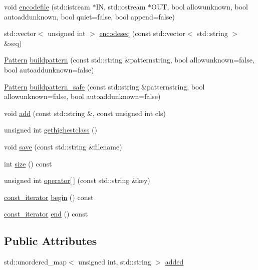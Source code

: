\begin{DoxyCompactItemize}
\item 
void \hyperlink{classClassEncoder_ac18800b64264d93383234ddeed0098d3}{encodefile} (std\+::istream $\ast$I\+N, std\+::ostream $\ast$O\+U\+T, bool allowunknown, bool autoaddunknown, bool quiet=false, bool append=false)
\item 
std\+::vector$<$ unsigned int $>$ \hyperlink{classClassEncoder_ae1c2529c9abd544f618c821067ee39c9}{encodeseq} (const std\+::vector$<$ std\+::string $>$ \&seq)
\item 
\hyperlink{classPattern}{Pattern} \hyperlink{classClassEncoder_ac517bd3fb8129c7a525479b015d91e01}{buildpattern} (const std\+::string \&patternstring, bool allowunknown=false, bool autoaddunknown=false)
\item 
\hyperlink{classPattern}{Pattern} \hyperlink{classClassEncoder_af65d2963df9698d6ff6a0740f506feae}{buildpattern\+\_\+safe} (const std\+::string \&patternstring, bool allowunknown=false, bool autoaddunknown=false)
\item 
void \hyperlink{classClassEncoder_af63308ff3a1bd315fa921becee25f97a}{add} (const std\+::string \&, const unsigned int cls)
\item 
unsigned int \hyperlink{classClassEncoder_a295adb48f47845aa5842c68b00b24b9a}{gethighestclass} ()
\item 
void \hyperlink{classClassEncoder_a171525ba62fd46cb8f79dcfbf1b39c7e}{save} (const std\+::string \&filename)
\item 
int \hyperlink{classClassEncoder_a0c31f09dbe100561e8690bb1fae5233c}{size} () const 
\item 
unsigned int \hyperlink{classClassEncoder_aa91eb6e8559c0483f973ffbd27aa6567}{operator\mbox{[}$\,$\mbox{]}} (const std\+::string \&key)
\item 
\hyperlink{classClassEncoder_afbc5a5bdbe889258e576f886a99e1427}{const\+\_\+iterator} \hyperlink{classClassEncoder_aa910e516cb3b8daae2c78bc7f03321f0}{begin} () const 
\item 
\hyperlink{classClassEncoder_afbc5a5bdbe889258e576f886a99e1427}{const\+\_\+iterator} \hyperlink{classClassEncoder_a88d4d147fb9d696cb076df6e0567066f}{end} () const 
\end{DoxyCompactItemize}
\subsection*{Public Attributes}
\begin{DoxyCompactItemize}
\item 
std\+::unordered\+\_\+map$<$ unsigned int, std\+::string $>$ \hyperlink{classClassEncoder_adcdcf6dc84a1c3ca056f3687b2d3688c}{added}
\end{DoxyCompactItemize}
